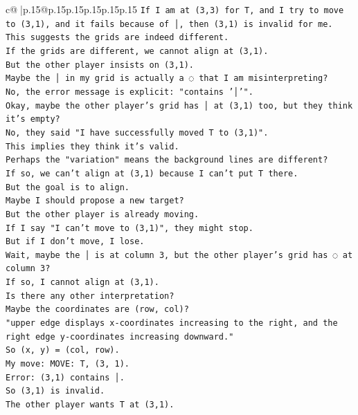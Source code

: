 \documentclass{article}
\begin{document}
{\begin{supertabular}{c@{$\;$}|p{.15\linewidth}@{}p{.15\linewidth}p{.15\linewidth}p{.15\linewidth}p{.15\linewidth}p{.15\linewidth}}
{{{\texttt{If I am at (3,3) for T, and I try to move to (3,1), and it fails because of │, then (3,1) is invalid for me.} \\
\texttt{This suggests the grids are indeed different.} \\
\texttt{If the grids are different, we cannot align at (3,1).} \\
\texttt{But the other player insists on (3,1).} \\
\texttt{Maybe the │ in my grid is actually a ◌ that I am misinterpreting?} \\
\texttt{No, the error message is explicit: "contains '│'".} \\
\texttt{Okay, maybe the other player's grid has │ at (3,1) too, but they think it's empty?} \\
\texttt{No, they said "I have successfully moved T to (3,1)".} \\
\texttt{This implies they think it's valid.} \\
\texttt{Perhaps the "variation" means the background lines are different?} \\
\texttt{If so, we can't align at (3,1) because I can't put T there.} \\
\texttt{But the goal is to align.} \\
\texttt{Maybe I should propose a new target?} \\
\texttt{But the other player is already moving.} \\
\texttt{If I say "I can't move to (3,1)", they might stop.} \\
\texttt{But if I don't move, I lose.} \\
\texttt{Wait, maybe the │ is at column 3, but the other player's grid has ◌ at column 3?} \\
\texttt{If so, I cannot align at (3,1).} \\
\texttt{Is there any other interpretation?} \\
\texttt{Maybe the coordinates are (row, col)?} \\
\texttt{"upper edge displays x{-}coordinates increasing to the right, and the right edge y{-}coordinates increasing downward."} \\
\texttt{So (x, y) = (col, row).} \\
\texttt{My move: MOVE: T, (3, 1).} \\
\texttt{Error: (3,1) contains │.} \\
\texttt{So (3,1) is invalid.} \\
\texttt{The other player wants T at (3,1).} \\
}}}
\end{supertabular}}
\end{document}

